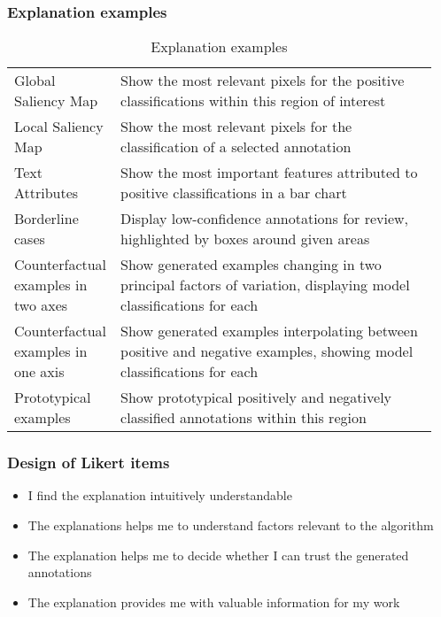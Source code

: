 \subsubsection{Explanation examples}

\begin{table*}
    \begin{tabular}%
        {%
        >{\raggedright\arraybackslash}p{0.20\linewidth}%
        p{0.75\linewidth}%
        }
        Global Saliency Map & Show the most relevant pixels for the positive classifications within this region of interest \\
        Local Saliency Map & Show the most relevant pixels for the classification of a selected annotation \\
        Text Attributes & Show the most important features attributed to positive classifications in a bar chart \\
        Borderline cases & Display low-confidence annotations for review, highlighted by boxes around given areas \\
        Counterfactual examples in two axes & Show generated examples changing in two principal factors of variation, displaying model classifications for each \\
        Counterfactual examples in one axis & Show generated examples interpolating between positive and negative examples, showing model classifications for each \\
        Prototypical examples & Show prototypical positively and negatively classified annotations within this region
    \end{tabular}
    \caption{Explanation examples}
    \label{table:explanations}
    \end{table*}
    

\subsubsection{Design of Likert items}

\begin{itemize}
    \item I find the explanation intuitively understandable
    \item The explanations helps me to understand factors relevant to the algorithm
    \item The explanation helps me to decide whether I can trust the generated annotations
    \item The explanation provides me with valuable information for my work
\end{itemize}

